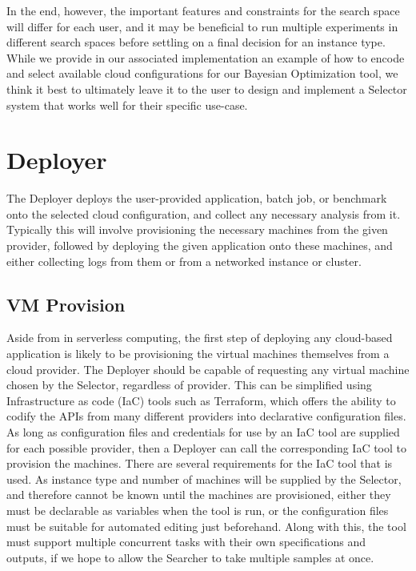 \documentclass{report}
\begin{document}
In the end,  however, the important features and constraints for the search space will differ for each user, and it may be beneficial to run multiple experiments in different search spaces before settling on a final decision for an instance type. While we provide in our associated implementation an example of how to encode and select available cloud configurations for our Bayesian Optimization tool, we think it best to ultimately leave it to the user to design and implement a Selector system that works well for their specific use-case.

\section{Deployer}
The Deployer deploys the user-provided application, batch job, or benchmark onto the selected cloud configuration, and collect any necessary analysis from it. Typically this will involve provisioning the necessary machines from the given provider, followed by deploying the given application onto these machines, and either collecting logs from them or from a networked instance or cluster. 

\subsection{VM Provision}
Aside from in serverless computing, the first step of deploying any cloud-based application is likely to be provisioning the virtual machines themselves from a cloud provider. The Deployer should be capable of requesting any virtual machine chosen by the Selector, regardless of provider. This can be simplified using Infrastructure as code (IaC) tools such as Terraform, which offers the ability to codify the APIs from many different providers into declarative configuration files. As long as configuration files and credentials for use by an IaC tool are supplied for each possible provider, then a Deployer can call the corresponding IaC tool to provision the machines. 
There are several requirements for the IaC tool that is used. As instance type and number of machines will be supplied by the Selector, and therefore cannot be known until the machines are provisioned, either they must be declarable as variables when the tool is run, or the configuration files must be suitable for automated editing just beforehand. Along with this, the tool must support multiple concurrent tasks with their own specifications and outputs, if we hope to allow the Searcher to take multiple samples at once.
\end{document}
